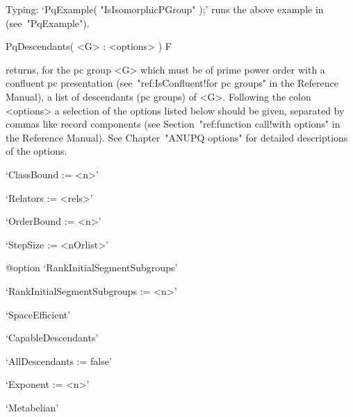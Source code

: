 Typing: `PqExample( "IsIsomorphicPGroup" );' runs the  above  example  in
{\GAP} (see~"PqExample").


\>PqDescendants( <G> : <options> ) F

returns, for the pc group <G> which must be of prime power order  with  a
confluent pc presentation (see~"ref:IsConfluent!for  pc  groups"  in  the
{\GAP} Reference Manual), a list  of  descendants  (pc  groups)  of  <G>.
Following the colon <options> a selection of  the  options  listed  below
should  be  given,  separated  by  commas  like  record  components  (see
Section~"ref:function call!with options" in the {\GAP} Reference Manual).
See Chapter~"ANUPQ options" for detailed descriptions of the options.

\beginlist%

\item{}`ClassBound := <n>'

\item{}`Relators := <rels>'

\item{}`OrderBound := <n>'

\item{}`StepSize := <nOrlist>'

%
{@option \noexpand`RankInitialSegmentSubgroups'}
\item{}`RankInitialSegmentSubgroups := <n>'

\item{}`SpaceEfficient'

\item{}`CapableDescendants'

\item{}`AllDescendants := false'

\item{}`Exponent := <n>'

\item{}`Metabelian'

